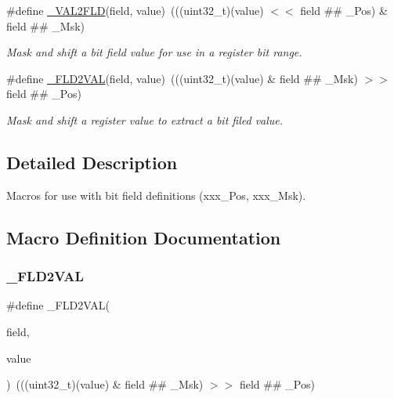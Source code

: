 \begin{DoxyCompactItemize}
\#define \mbox{\hyperlink{group___c_m_s_i_s__core__bitfield_ga286e3b913dbd236c7f48ea70c8821f4e}{\+\_\+\+V\+A\+L2\+F\+LD}}(field,  value)~(((uint32\+\_\+t)(value) $<$$<$ field \#\# \+\_\+\+Pos) \& field \#\# \+\_\+\+Msk)
\begin{DoxyCompactList}\small\item\em Mask and shift a bit field value for use in a register bit range. \end{DoxyCompactList}\item 
\#define \mbox{\hyperlink{group___c_m_s_i_s__core__bitfield_ga139b6e261c981f014f386927ca4a8444}{\+\_\+\+F\+L\+D2\+V\+AL}}(field,  value)~(((uint32\+\_\+t)(value) \& field \#\# \+\_\+\+Msk) $>$$>$ field \#\# \+\_\+\+Pos)
\begin{DoxyCompactList}\small\item\em Mask and shift a register value to extract a bit filed value. \end{DoxyCompactList}\end{DoxyCompactItemize}


\subsection{Detailed Description}
Macros for use with bit field definitions (xxx\+\_\+\+Pos, xxx\+\_\+\+Msk). 



\subsection{Macro Definition Documentation}
\mbox{\label{group___c_m_s_i_s__core__bitfield_ga139b6e261c981f014f386927ca4a8444}} 
\subsubsection{\texorpdfstring{\+\_\+\+F\+L\+D2\+V\+AL}{\_FLD2VAL}\hspace{0.1cm}{\footnotesize\ttfamily [1/3]}}
{\footnotesize\ttfamily \#define \+\_\+\+F\+L\+D2\+V\+AL(\begin{DoxyParamCaption}\item[{}]{field,  }\item[{}]{value }\end{DoxyParamCaption})~(((uint32\+\_\+t)(value) \& field \#\# \+\_\+\+Msk) $>$$>$ field \#\# \+\_\+\+Pos)}




